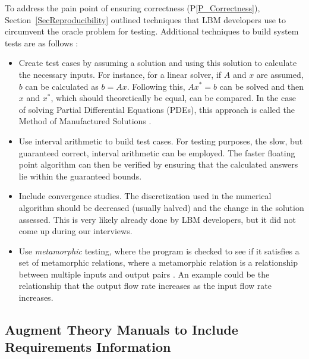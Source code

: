 \documentclass[final, 3p, times, authoryear]{elsarticle}
\newcommand{\ppref}[1]{P\ref{#1}}
\begin{document}
To address the pain point of ensuring correctness (\ppref{P_Correctness}),
Section~\ref{SecReproducibility} outlined techniques that LBM developers use to
circumvent the oracle problem for testing.  Additional techniques to build
system tests are as follows \citep{Smith2016}: 

\begin{itemize}

\item Create test cases by assuming a solution and using this solution to
  calculate the necessary inputs.  For instance, for a linear solver, if $A$ and
  $x$ are assumed, $b$ can be calculated as $b = A x$.  Following this, $A x^* =
  b$ can be solved and then $x$ and $x^*$, which should theoretically be equal,
  can be compared.  In the case of solving Partial Differential Equations
  (PDEs), this approach is called the Method of Manufactured Solutions
  \citep{Roache1998}.
\item Use interval arithmetic to build test cases.  For testing purposes, the
  slow, but guaranteed correct, interval arithmetic \citep{Hickey2001} can be
  employed. The faster floating point algorithm can then be verified by ensuring
  that the calculated answers lie within the guaranteed bounds.
\item Include convergence studies.  The discretization used in the numerical
  algorithm should be decreased (usually halved) and the change in the solution
  assessed.  This is very likely already done by LBM developers, but it did not
  come up during our interviews.
\item Use \emph{metamorphic} testing, where the program is checked to see if it
  satisfies a set of metamorphic relations, where a metamorphic relation is a
  relationship between multiple inputs and output pairs
  \citep{KanewalaAndLundgren2016}.  An example could be the relationship that
  the output flow rate increases as the input flow rate increases.
\end{itemize}

\subsection{Augment Theory Manuals to Include Requirements Information} \label{Sec_AugTheoryMans}
\end{document}
